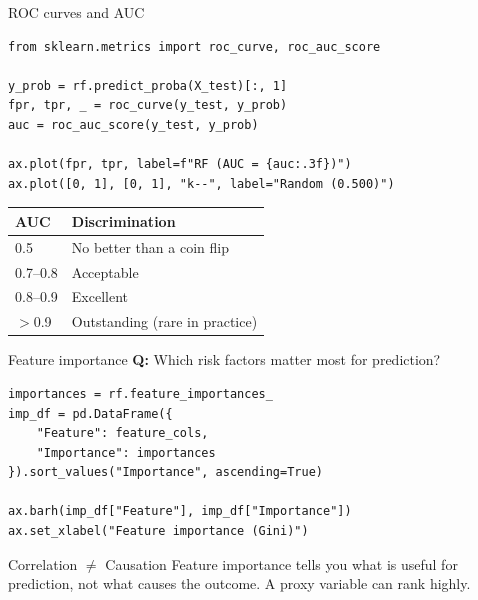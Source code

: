 \documentclass[aspectratio=169,11pt]{beamer}
\begin{document}
\begin{frame}[fragile]{ROC curves and AUC}
\begin{verbatim}
from sklearn.metrics import roc_curve, roc_auc_score

y_prob = rf.predict_proba(X_test)[:, 1]
fpr, tpr, _ = roc_curve(y_test, y_prob)
auc = roc_auc_score(y_test, y_prob)

ax.plot(fpr, tpr, label=f"RF (AUC = {auc:.3f})")
ax.plot([0, 1], [0, 1], "k--", label="Random (0.500)")
\end{verbatim}

\begin{table}
\begin{tabular}{ll}
\toprule
\textbf{AUC} & \textbf{Discrimination} \\
\midrule
0.5 & No better than a coin flip \\
0.7--0.8 & Acceptable \\
0.8--0.9 & Excellent \\
$>$0.9 & Outstanding (rare in practice) \\
\bottomrule
\end{tabular}
\end{table}
\end{frame}

\begin{frame}[fragile]{Feature importance}
\textbf{Q:} Which risk factors matter most for prediction?

\begin{verbatim}
importances = rf.feature_importances_
imp_df = pd.DataFrame({
    "Feature": feature_cols,
    "Importance": importances
}).sort_values("Importance", ascending=True)

ax.barh(imp_df["Feature"], imp_df["Importance"])
ax.set_xlabel("Feature importance (Gini)")
\end{verbatim}

\begin{alertblock}{Correlation $\neq$ Causation}
Feature importance tells you what is useful for \alert{prediction}, not what \alert{causes} the outcome. A proxy variable can rank highly.
\end{alertblock}
\end{frame}
\end{document}
